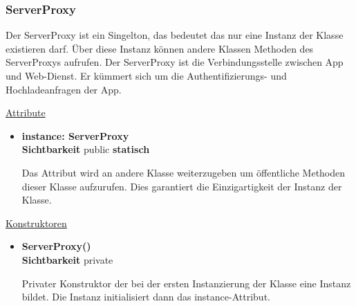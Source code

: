 \subsubsection{ServerProxy} \label{app:klasse:ServerProxy}
Der ServerProxy ist ein Singelton, das bedeutet das nur eine Instanz der  Klasse existieren darf. Über diese Instanz können andere Klassen Methoden des ServerProxys aufrufen. Der ServerProxy ist die Verbindungsstelle zwischen App und Web-Dienst. Er kümmert sich um die Authentifizierungs- und Hochladeanfragen der App.\newline

\underline{Attribute}
\begin{itemize}
\itemsep0pt
\item \textbf{instance: ServerProxy} \hfill\\ 
\textbf{Sichtbarkeit} public \newline
\textbf{statisch} 

Das Attribut wird an andere Klasse weiterzugeben um öffentliche Methoden dieser Klasse aufzurufen. Dies garantiert die Einzigartigkeit der Instanz der Klasse. 

\end{itemize}

\underline{Konstruktoren}
\begin{itemize}
\itemsep0pt
\item \textbf{ServerProxy()} \hfill\\
\textbf{Sichtbarkeit} private

Privater Konstruktor der bei der ersten Instanzierung der Klasse eine Instanz bildet. Die Instanz initialisiert dann das instance-Attribut. 
\end{itemize}


